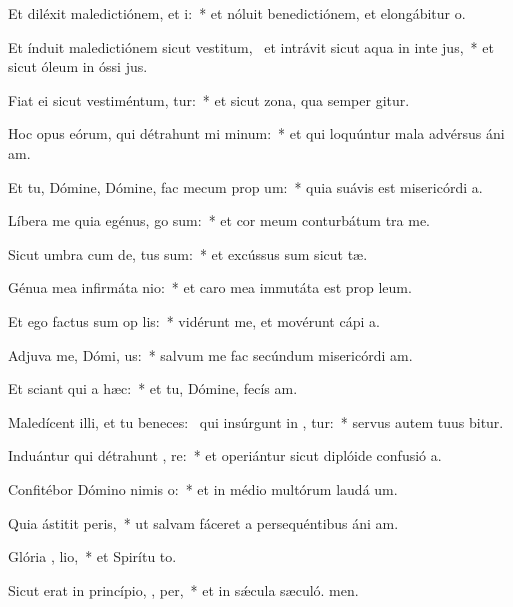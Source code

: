 \item Et diléxit maledictiónem, et  i:~* et nóluit benedictiónem, et elongábitur  o.
\item Et índuit maledictiónem sicut vestitum,~\pscross{} et intrávit sicut aqua in inte jus,~* et sicut óleum in óssi jus.
\item Fiat ei sicut vestiméntum,  tur:~* et sicut zona, qua semper gitur.
\item Hoc opus eórum, qui détrahunt mi  minum:~* et qui loquúntur mala advérsus áni am.
\item Et tu, Dómine, Dómine, fac mecum prop  um:~* quia suávis est misericórdi a.
\item Líbera me quia egénus,   go sum:~* et cor meum conturbátum  tra me.
\item Sicut umbra cum de, tus sum:~* et excússus sum sicut tæ.
\item Génua mea infirmáta   nio:~* et caro mea immutáta est prop leum.
\item Et ego factus sum op lis:~* vidérunt me, et movérunt cápi a.
\item Adjuva me, Dómi,  us:~* salvum me fac secúndum misericórdi am.
\item Et sciant qui  a hæc:~* et tu, Dómine, fecís am.
\item Maledícent illi, et tu beneces:~\pscross{} qui insúrgunt in , tur:~* servus autem tuus bitur.
\item Induántur qui détrahunt , re:~* et operiántur sicut diplóide confusió a.
\item Confitébor Dómino nimis   o:~* et in médio multórum laudá um.
\item Quia ástitit   peris,~* ut salvam fáceret a persequéntibus áni am.
\item Glória ,  lio,~* et Spirítu to.
\item Sicut erat in princípio,  ,  per,~* et in sǽcula sæculó. men.
